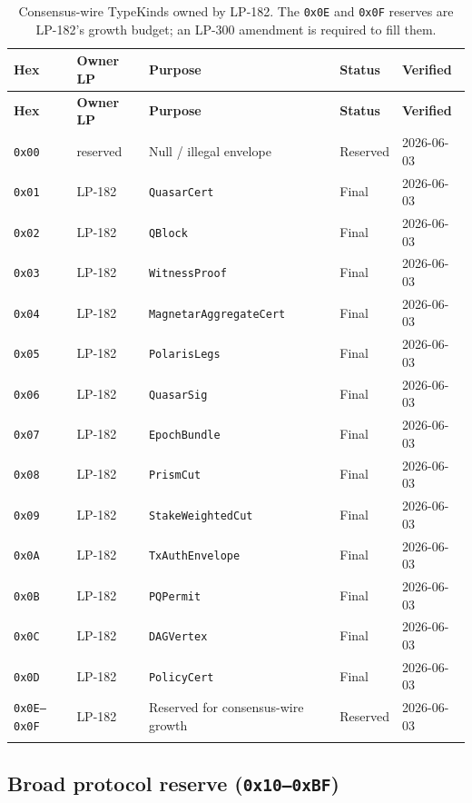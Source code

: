 \begin{longtable}{@{}p{1.9cm}p{1.4cm}p{6.7cm}p{1.4cm}p{1.6cm}@{}}
\toprule
\textbf{Hex} & \textbf{Owner LP} & \textbf{Purpose} & \textbf{Status} & \textbf{Verified} \\
\midrule
\endfirsthead
\toprule
\textbf{Hex} & \textbf{Owner LP} & \textbf{Purpose} & \textbf{Status} & \textbf{Verified} \\
\midrule
\endhead
\texttt{0x00} & reserved & Null / illegal envelope & Reserved & 2026-06-03 \\
\texttt{0x01} & LP-182 & \texttt{QuasarCert} & Final & 2026-06-03 \\
\texttt{0x02} & LP-182 & \texttt{QBlock} & Final & 2026-06-03 \\
\texttt{0x03} & LP-182 & \texttt{WitnessProof} & Final & 2026-06-03 \\
\texttt{0x04} & LP-182 & \texttt{MagnetarAggregateCert} & Final & 2026-06-03 \\
\texttt{0x05} & LP-182 & \texttt{PolarisLegs} & Final & 2026-06-03 \\
\texttt{0x06} & LP-182 & \texttt{QuasarSig} & Final & 2026-06-03 \\
\texttt{0x07} & LP-182 & \texttt{EpochBundle} & Final & 2026-06-03 \\
\texttt{0x08} & LP-182 & \texttt{PrismCut} & Final & 2026-06-03 \\
\texttt{0x09} & LP-182 & \texttt{StakeWeightedCut} & Final & 2026-06-03 \\
\texttt{0x0A} & LP-182 & \texttt{TxAuthEnvelope} & Final & 2026-06-03 \\
\texttt{0x0B} & LP-182 & \texttt{PQPermit} & Final & 2026-06-03 \\
\texttt{0x0C} & LP-182 & \texttt{DAGVertex} & Final & 2026-06-03 \\
\texttt{0x0D} & LP-182 & \texttt{PolicyCert} & Final & 2026-06-03 \\
\texttt{0x0E--0x0F} & LP-182 & Reserved for consensus-wire growth & Reserved & 2026-06-03 \\
\bottomrule
\caption{Consensus-wire TypeKinds owned by LP-182. The \texttt{0x0E}
and \texttt{0x0F} reserves are LP-182's growth budget; an LP-300
amendment is required to fill them.}
\label{tab:typekind-lp182}
\end{longtable}

\subsection{Broad protocol reserve (\texttt{0x10--0xBF})}

